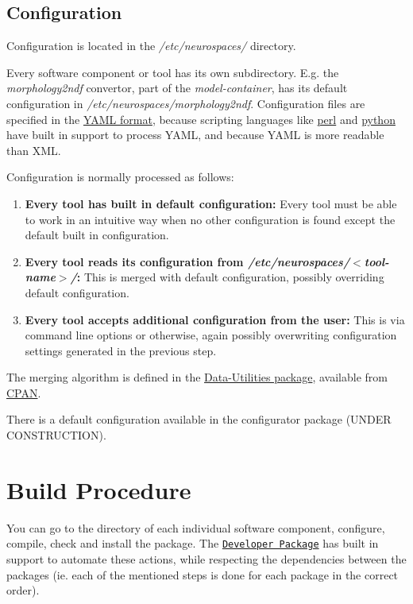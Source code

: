 \documentclass[12pt]{article}
\begin{document}
\subsection*{Configuration}

Configuration is located in the {\it /etc/neurospaces/} directory.

Every software component or tool has its own subdirectory. E.g. the {\it morphology2ndf} convertor, part of the {\it model-container}, has its default configuration in {\it /etc/neurospaces/morphology2ndf}. Configuration files are specified in the \href{http://www.yaml.org/}{YAML format}, because scripting languages like \href{http://www.perl.org/}{perl} and \href{http://www.python.org/}{python} have built in support to process YAML, and because YAML is more readable than XML.

Configuration is normally processed as follows:
\begin{enumerate}
\item {\bf Every tool has built in default configuration:} Every tool must be able to work in an intuitive way when no other configuration is found except the default built in configuration.
\item {\bf Every tool reads its configuration from {\it /etc/neurospaces/$<$tool-name$>$/}:} This is merged with default configuration, possibly overriding default configuration.
\item {\bf Every tool accepts additional configuration from the user:} This is via command line options or otherwise, again possibly overwriting configuration settings generated in the previous step. 
\end{enumerate}
The merging algorithm is defined in the \href{http://search.cpan.org/dist/Data-Utilities/}{Data-Utilities package}, available from \href{http://www.cpan.org/}{CPAN}.

There is a default configuration available in the configurator package (UNDER CONSTRUCTION). 

\section*{Build Procedure}

You can go to the directory of each individual software component,
configure, compile, check and install the package. The
\href{../developer-package/developer-package.tex}{\tt Developer
  Package} has built in support to automate these actions, while
respecting the dependencies between the packages (ie. each of the
mentioned steps is done for each package in the correct order).
\end{document}

